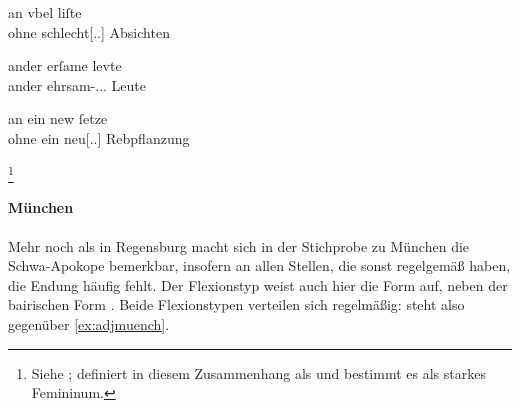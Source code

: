 \begin{exe}
\ex \label{ex:adjregbge}
	\begin{xlist}
	\ex \label{ex:adjregbge_3}
		\gll an vbel liſte \\
			ohne schlecht[\Acc.\Pl.\MascI] Absichten \\
		\begin{taggedline}{\parencites(Laaber, Kr.~Regensburg, 1294)[\pno~1970, 224.26]{cao3}}
		\trans {}
		\end{taggedline}

	\ex \label{ex:adjregbge_1}
		\gll ander erſame levte \\
			ander ehrsam-\Nom.\Pl.\MascA.\St{} Leute \\
		\begin{taggedline}{\parencites(Regensburg, 1299)[\pno~3404, 507.43]{cao4}}
		\trans {}
		\end{taggedline}

	\ex \label{ex:adjregbge_2}
		\gll an ein new ſetze \\
			ohne ein neu[\Acc.\Sg.\FemI] Rebpflanzung \\
		\begin{taggedline}{\parencites(Regensburg, 1290)[\pno~N~447, 328.38]{cao5}}
		\trans {}%
			\footnote{Siehe \citet[]{caor}; \citet[\pno~]{%
				lexer:mhdhwb} definiert  in diesem Zusammenhang als
				 und bestimmt es als starkes Femininum.}
		\end{taggedline}
	\end{xlist}
\end{exe}

\paragraph{München}
\label{par:adjmuenchen}
Mehr noch als in Regensburg macht sich in der Stichprobe zu München die
Schwa-Apokope bemerkbar, insofern an allen Stellen, die sonst regelgemäß
 haben, die Endung häufig fehlt. Der Flexionstyp  weist
auch hier die Form  auf, neben der bairischen Form . Beide
Flexionstypen verteilen sich regelmäßig:  steht also 
gegenüber \cref{ex:adjmuench}.

